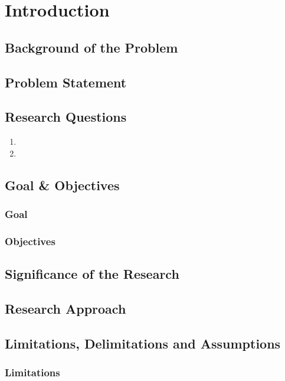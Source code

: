 \documentclass[12pt,a4paper]{report}
\begin{document}
\listoftables
{}


\begin{tabular}{ll}

\end{tabular}
\clearpage


\chapter{Introduction}
\section{Background of the Problem}
\section{Problem Statement}
\section{Research Questions}
\begin{enumerate}
    \item 
    \item
\end{enumerate}
\section{Goal \& Objectives}
\subsection{Goal}
\subsection{Objectives}
\section{Significance of the Research}
\section{Research Approach}
\section{Limitations, Delimitations and Assumptions}
\subsection{Limitations}
\end{document}
